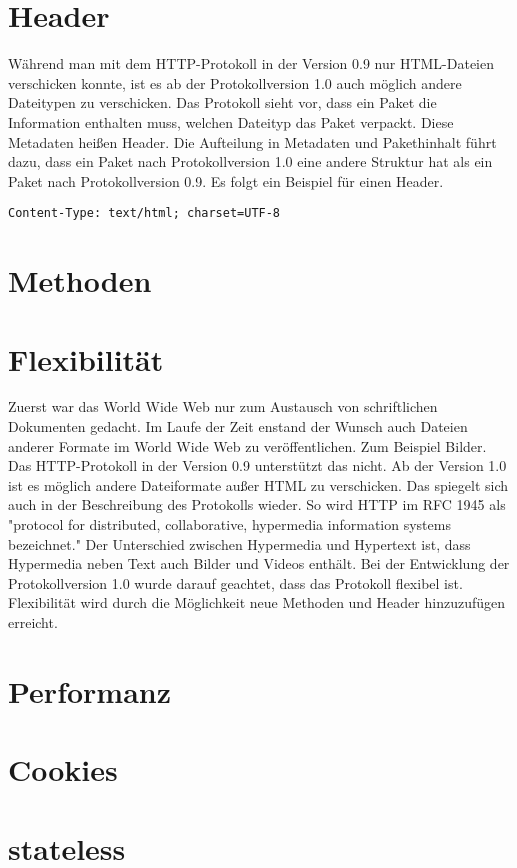 \documentclass{llncs}
\begin{document}
\section{Header}
Während man mit dem HTTP-Protokoll in der Version 0.9 nur HTML-Dateien verschicken konnte, ist es ab der Protokollversion 1.0 auch möglich andere Dateitypen zu verschicken. Das Protokoll sieht vor, dass ein Paket die Information enthalten muss, welchen Dateityp das Paket verpackt. Diese Metadaten heißen Header. Die Aufteilung in Metadaten und Pakethinhalt führt dazu, dass ein Paket nach Protokollversion 1.0 eine andere Struktur hat als ein Paket nach Protokollversion 0.9. Es folgt ein Beispiel für einen Header.
\begin{verbatim}
Content-Type: text/html; charset=UTF-8
\end{verbatim}
\section{Methoden}
\section{Flexibilität}
Zuerst war das World Wide Web nur zum Austausch von schriftlichen Dokumenten gedacht. Im Laufe der Zeit enstand der Wunsch auch Dateien anderer Formate im World Wide Web zu veröffentlichen. Zum Beispiel Bilder. Das HTTP-Protokoll in der Version 0.9 unterstützt das nicht. Ab der Version 1.0 ist es möglich andere Dateiformate außer HTML zu verschicken. Das spiegelt sich auch in der Beschreibung des Protokolls wieder. So wird HTTP im RFC 1945 als "protocol for distributed, collaborative, hypermedia information systems bezeichnet." Der Unterschied zwischen Hypermedia und Hypertext ist, dass Hypermedia neben Text auch Bilder und Videos enthält.
Bei der Entwicklung der Protokollversion 1.0 wurde darauf geachtet, dass das Protokoll flexibel ist. Flexibilität wird durch die Möglichkeit neue Methoden und Header hinzuzufügen erreicht. 
\section{Performanz}
\section{Cookies}
\section{stateless}


\end{document}
